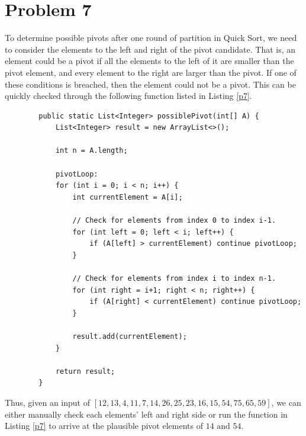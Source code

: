 \documentclass{report}
\begin{document}
\section{Problem 7}
To determine possible pivots after one round of partition in Quick Sort, we need to consider the elements to the left and right of the pivot candidate. That is, an element could be a pivot if all the elements to the left of it are smaller than the pivot element, and every element to the right are larger than the pivot. If one of these conditions is breached, then the element could not be a pivot. This can be quickly checked through the following function listed in Listing \ref{p7}.
\begin{listing}[h]
	\begin{verbatim}
		public static List<Integer> possiblePivot(int[] A) {
			List<Integer> result = new ArrayList<>();
			
			int n = A.length;
			
			pivotLoop:
			for (int i = 0; i < n; i++) {
				int currentElement = A[i];
				
				// Check for elements from index 0 to index i-1.
				for (int left = 0; left < i; left++) {
					if (A[left] > currentElement) continue pivotLoop;
				}
				
				// Check for elements from index i to index n-1.
				for (int right = i+1; right < n; right++) {
					if (A[right] < currentElement) continue pivotLoop;
				}
				
				result.add(currentElement);
			}
			
			return result;
		}
	\end{verbatim}
	\caption{Java implementation to search for possible pivot elements.}
	\label{p7}
\end{listing}

Thus, given an input of $[12, 13, 4, 11, 7, 14, 26, 25, 23, 16, 15, 54, 75, 65, 59]$, we can either manually check each elements' left and right side or run the function in Listing \ref{p7} to arrive at the plausible pivot elements of $\boxed{14 \text{ and } 54.}$
\end{document}

